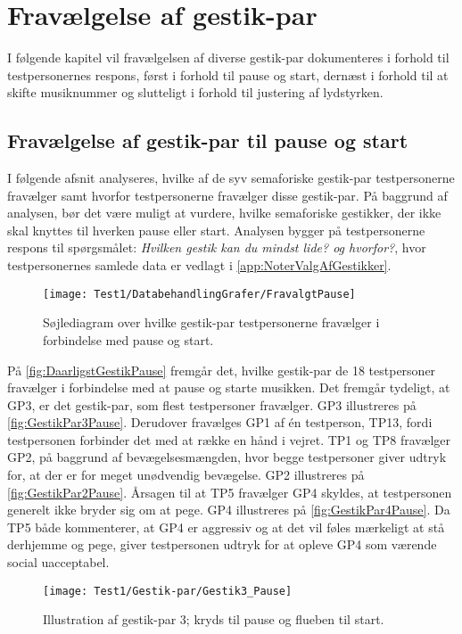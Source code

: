 \chapter{Fravælgelse af gestik-par}
\label{app:TestresultaterFravaelgelse}
%
I følgende kapitel vil fravælgelsen af diverse gestik-par dokumenteres i forhold til testpersonernes respons, først i forhold til pause og start, dernæst i forhold til at skifte musiknummer og slutteligt i forhold til justering af lydstyrken. 
%
\section{Fravælgelse af gestik-par til pause og start}
\label{app:TestresultaterPauseDaarlig} 
%
I følgende afsnit analyseres, hvilke af de syv semaforiske gestik-par testpersonerne fravælger samt hvorfor testpersonerne fravælger disse gestik-par. På baggrund af analysen, bør det være muligt at vurdere, hvilke semaforiske gestikker, der ikke skal knyttes til hverken pause eller start. Analysen bygger på testpersonerne respons til spørgsmålet: \textit{Hvilken gestik kan du mindst lide? og hvorfor?}, hvor testpersonernes samlede data er vedlagt i \autoref{app:NoterValgAfGestikker}.
%
\begin{figure}[H]
	\centering
	\texttt{[image: Test1/DatabehandlingGrafer/FravalgtPause]}
	\caption{Søjlediagram over hvilke gestik-par testpersonerne fravælger i forbindelse med pause og start.}
	\label{fig:DaarligstGestikPause}
\end{figure}
\noindent
% 
På \autoref{fig:DaarligstGestikPause} fremgår det, hvilke gestik-par de 18 testpersoner fravælger i forbindelse med at pause og starte musikken. Det fremgår tydeligt, at GP3, er det gestik-par, som flest testpersoner fravælger. GP3 illustreres på \autoref{fig:GestikPar3Pause}. Derudover fravælges GP1 af én testperson, TP13, fordi testpersonen forbinder det med at række en hånd i vejret. TP1 og TP8 fravælger GP2, på baggrund af bevægelsesmængden, hvor begge testpersoner giver udtryk for, at der er for meget unødvendig bevægelse. GP2 illustreres på \autoref{fig:GestikPar2Pause}. Årsagen til at TP5 fravælger GP4 skyldes, at testpersonen generelt ikke bryder sig om at pege. GP4 illustreres på \autoref{fig:GestikPar4Pause}. Da TP5 både kommenterer, at GP4 er aggressiv og at det vil føles mærkeligt at stå derhjemme og pege, giver testpersonen udtryk for at opleve GP4 som værende social uacceptabel. 
%
\begin{figure}[H]
	\centering
	\texttt{[image: Test1/Gestik-par/Gestik3\_Pause]}
	\caption{Illustration af gestik-par 3; kryds til pause og flueben til start.}
	\label{fig:GestikPar3Pause}
\end{figure}

